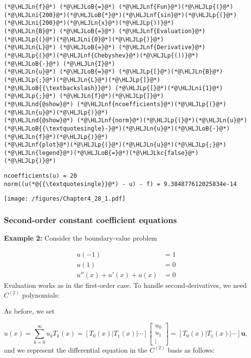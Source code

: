 \documentclass[12pt,a4paper]{article}
\newcommand{\HLJLkc}[1]{\textcolor[RGB]{59,151,46}{\textit{#1}}}
\newcommand{\HLJLn}[1]{#1}
\newcommand{\HLJLnd}[1]{\textcolor[RGB]{214,102,97}{#1}}
\newcommand{\HLJLnf}[1]{\textcolor[RGB]{66,102,213}{#1}}
\newcommand{\HLJLni}[1]{\textcolor[RGB]{59,151,46}{#1}}
\newcommand{\HLJLoB}[1]{\textcolor[RGB]{102,102,102}{\textbf{#1}}}
\newcommand{\HLJLp}[1]{#1}
\begin{document}
\begin{lstlisting}
(*@\HLJLn{f}@*) (*@\HLJLoB{=}@*) (*@\HLJLnf{Fun}@*)(*@\HLJLp{(}@*)(*@\HLJLni{200}@*)(*@\HLJLoB{*}@*)(*@\HLJLnf{sin}@*)(*@\HLJLp{(}@*)(*@\HLJLni{200}@*)(*@\HLJLn{x}@*)(*@\HLJLp{))}@*)
(*@\HLJLn{B}@*) (*@\HLJLoB{=}@*) (*@\HLJLnf{Evaluation}@*)(*@\HLJLp{(}@*)(*@\HLJLni{0}@*)(*@\HLJLp{)}@*)
(*@\HLJLn{L}@*) (*@\HLJLoB{=}@*) (*@\HLJLnf{Derivative}@*)(*@\HLJLp{(}@*)(*@\HLJLnf{Chebyshev}@*)(*@\HLJLp{())}@*) (*@\HLJLoB{-}@*) (*@\HLJLn{I}@*)
(*@\HLJLn{u}@*) (*@\HLJLoB{=}@*) (*@\HLJLp{[}@*)(*@\HLJLn{B}@*)(*@\HLJLp{;}@*)(*@\HLJLn{L}@*)(*@\HLJLp{]}@*) (*@\HLJLoB{{\textbackslash}}@*) (*@\HLJLp{[}@*)(*@\HLJLni{1}@*)(*@\HLJLp{;}@*) (*@\HLJLn{f}@*)(*@\HLJLp{]}@*)
(*@\HLJLnd{@show}@*) (*@\HLJLnf{ncoefficients}@*)(*@\HLJLp{(}@*)(*@\HLJLn{u}@*)(*@\HLJLp{)}@*)
(*@\HLJLnd{@show}@*) (*@\HLJLnf{norm}@*)(*@\HLJLp{(}@*)(*@\HLJLn{u}@*)(*@\HLJLoB{{\textquotesingle}-}@*)(*@\HLJLn{u}@*)(*@\HLJLoB{-}@*)(*@\HLJLn{f}@*)(*@\HLJLp{)}@*)
(*@\HLJLnf{plot}@*)(*@\HLJLp{(}@*)(*@\HLJLn{u}@*)(*@\HLJLp{;}@*)(*@\HLJLn{legend}@*)(*@\HLJLoB{=}@*)(*@\HLJLkc{false}@*)(*@\HLJLp{)}@*)
\end{lstlisting}

\begin{lstlisting}
ncoefficients(u) = 20
norm((u(*@{{\textquotesingle}}@*) - u) - f) = 9.384877612025834e-14
\end{lstlisting}

\texttt{[image: /figures/Chapter4\_28\_1.pdf]}

\subsubsection{Second-order constant coefficient equations}
\textbf{Example 2:}   Consider the boundary-value problem


\begin{align*}
u(-1) &= 1\\
u(1) &= 0\\
u''(x) + u'(x)  + u(x) &= 0
\end{align*}
Evaluation works as in the first-order case. To handle second-derivatives, we need $C^{(2)}$ polynomials:

As before, we set

\[
u(x) = \sum_{k=0}^\infty u_k T_k(x) = \left[ T_0(x) | T_1(x) | \cdots \right] \begin{bmatrix} u_0 \\ u_1 \\ \vdots \end{bmatrix}=  \left[ T_0(x) | T_1(x) | \cdots \right] \mathbf{u},
\]
and we represent the differential equation in the $C^{(2)}$ basis as follows:
\end{document}
